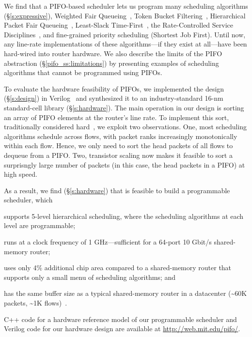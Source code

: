 We find that a PIFO-based scheduler lets us program many scheduling algorithms
(\S\ref{s:expressive}), \eg Weighted Fair Queueing~\cite{wfq}, Token Bucket
Filtering~\cite{tbf}, Hierarchical Packet Fair Queueing~\cite{hpfq},
Least-Slack Time-First~\cite{lstf}, the Rate-Controlled Service
Disciplines~\cite{rcsd}, and fine-grained priority scheduling (\eg Shortest Job
First). Until now, any line-rate implementations of these algorithms---if they
exist at all---have been hard-wired into router hardware. We also describe the
limits of the PIFO abstraction (\S\ref{pifo_ss:limitations}) by presenting
examples of scheduling algorithms that cannot be programmed using PIFOs.

To evaluate the hardware feasibility of PIFOs, we implemented the design
(\S\ref{s:design}) in Verilog~\cite{system_verilog} and synthesized it to an
industry-standard 16-nm standard-cell library (\S\ref{s:hardware}). The main
operation in our design is sorting an array of PIFO elements at the router's
line rate. To implement this sort, traditionally considered hard~\cite{sfq,
drr}, we exploit two observations. One, most scheduling algorithms schedule
across flows, with packet ranks increasingly monotonically within each flow.
Hence, we only need to sort the head packets of all flows to dequeue from a
PIFO.  Two, transistor scaling now makes it feasible to sort a surprisngly
large number of packets (in this case, the head packets in a PIFO) at high
speed.

As a result, we find (\S\ref{s:hardware}) that is feasible to build a
programmable scheduler, which
\begin{CompactItemize}
  \item supports 5-level hierarchical scheduling, where the scheduling
    algorithms at each level are programmable;
  \item runs at a clock frequency of 1 GHz---sufficient for a 64-port
    10 Gbit/s shared-memory router;
  \item uses only 4\% additional chip area compared to a
    shared-memory router that supports only a small menu of scheduling
    algorithms; and
  \item has the same buffer size as a typical shared-memory router
    in a datacenter (\textasciitilde 60K packets, \textasciitilde 1K flows)~\cite{trident2}.
\end{CompactItemize}

 C++ code for a hardware reference model of our programmable scheduler and
Verilog code for our hardware design are available at
\url{http://web.mit.edu/pifo/}.
